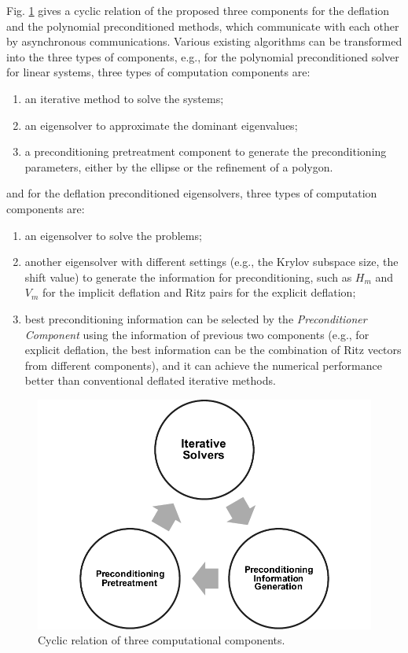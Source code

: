 Fig. \ref{fig:cyclic} gives a cyclic relation of the proposed three components for the deflation and the polynomial preconditioned methods, which communicate with each other by asynchronous communications. Various existing algorithms can be transformed into the three types of components, e.g., for the polynomial preconditioned solver for linear systems, three types of computation components are: 
\begin{enumerate}[label=(\arabic*)]
	\item an iterative method to solve the systems;
	\item an eigensolver to approximate the dominant eigenvalues;
	\item a preconditioning pretreatment component to generate the preconditioning parameters, either by the ellipse or the refinement of a polygon.
\end{enumerate}

and for the deflation preconditioned eigensolvers, three types of computation components are: 

\begin{enumerate}[label=(\arabic*)]
	\item an eigensolver to solve the problems; 
	\item another eigensolver with different settings (e.g., the Krylov subspace size, the shift value) to generate the information for preconditioning, such as $H_m$ and $V_m$ for the implicit deflation and Ritz pairs for the explicit deflation; 
	\item best preconditioning information can be selected by the \textit{Preconditioner Component} using the information of previous two components (e.g., for explicit deflation, the best information can be the combination of Ritz vectors from different components), and it can achieve the numerical performance better than conventional deflated iterative methods.
\end{enumerate}


\begin{figure}[htbp]
	\centering
	\includegraphics[width=0.8\linewidth]{fig/cyclic.pdf}
	\caption{Cyclic relation of three computational components.}
	\label{fig:cyclic}
\end{figure}

